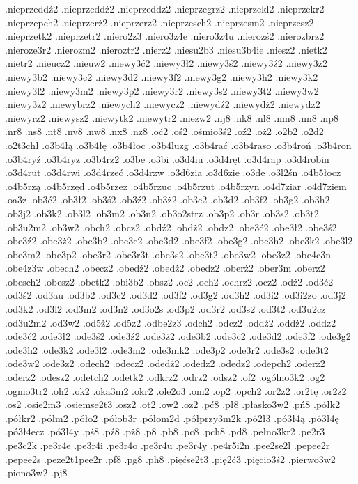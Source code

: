 {.nieprzeddź2
.nieprzeddż2
.nieprzeddz2
.nieprzegrz2
.nieprzekl2
.nieprzekr2
.nieprzepch2
.nieprzerż2
.nieprzerz2
.nieprzesch2
.nieprzesm2
.nieprzesz2
.nieprzetk2
.nieprzetr2
.niero2z3
.niero3z4e
.niero3z4u
.nierozś2
.nierozbrz2
.nieroze3r2
.nierozm2
.nieroztr2
.nierz2
.niesu2b3
.niesu3b4ie
.niesz2
.nietk2
.nietr2
.nieucz2
.nieuw2
.niewy3ć2
.niewy3ł2
.niewy3ś2
.niewy3ź2
.niewy3ż2
.niewy3b2
.niewy3c2
.niewy3d2
.niewy3f2
.niewy3g2
.niewy3h2
.niewy3k2
.niewy3l2
.niewy3m2
.niewy3p2
.niewy3r2
.niewy3s2
.niewy3t2
.niewy3w2
.niewy3z2
.niewybrz2
.niewych2
.niewycz2
.niewydź2
.niewydż2
.niewydz2
.niewyrz2
.niewysz2
.niewytk2
.niewytr2
.niezw2
.nj8
.nk8
.nl8
.nm8
.nn8
.np8
.nr8
.ns8
.nt8
.nv8
.nw8
.nx8
.nz8
.oć2
.oś2
.ośmio3ś2
.oź2
.oż2
.o2b2
.o2d2
.o2t3chł
.o3b4łą
.o3b4łę
.o3b4łoc
.o3b4luzg
.o3b4rać
.o3b4raso
.o3b4roń
.o3b4ron
.o3b4ryź
.o3b4ryz
.o3b4rz2
.o3be
.o3bi
.o3d4iu
.o3d4ręt
.o3d4rap
.o3d4robin
.o3d4rut
.o3d4rwi
.o3d4rzeć
.o3d4rzw
.o3d6zia
.o3d6zie
.o3de
.o3l2śn
.o4b5łocz
.o4b5rzą
.o4b5rzęd
.o4b5rzez
.o4b5rzuc
.o4b5rzut
.o4b5rzyn
.o4d7ziar
.o4d7ziem
.oa3z
.ob3ć2
.ob3ł2
.ob3ś2
.ob3ź2
.ob3ż2
.ob3c2
.ob3d2
.ob3f2
.ob3g2
.ob3h2
.ob3j2
.ob3k2
.ob3l2
.ob3m2
.ob3n2
.ob3o2strz
.ob3p2
.ob3r
.ob3s2
.ob3t2
.ob3u2m2
.ob3w2
.obch2
.obcz2
.obdź2
.obdż2
.obdz2
.obe3ć2
.obe3ł2
.obe3ś2
.obe3ź2
.obe3ż2
.obe3b2
.obe3c2
.obe3d2
.obe3f2
.obe3g2
.obe3h2
.obe3k2
.obe3l2
.obe3m2
.obe3p2
.obe3r2
.obe3r3t
.obe3s2
.obe3t2
.obe3w2
.obe3z2
.obe4c3n
.obe4z3w
.obech2
.obecz2
.obedź2
.obedż2
.obedz2
.oberż2
.ober3m
.oberz2
.obesch2
.obesz2
.obetk2
.obi3b2
.obsz2
.oc2
.och2
.ochrz2
.ocz2
.odź2
.od3ć2
.od3ś2
.od3au
.od3b2
.od3c2
.od3d2
.od3f2
.od3g2
.od3h2
.od3i2
.od3i2zo
.od3j2
.od3k2
.od3l2
.od3m2
.od3n2
.od3o2s
.od3p2
.od3r2
.od3s2
.od3t2
.od3u2cz
.od3u2m2
.od3w2
.od5ż2
.od5z2
.odbe2z3
.odch2
.odcz2
.oddź2
.oddż2
.oddz2
.ode3ć2
.ode3ł2
.ode3ś2
.ode3ź2
.ode3ż2
.ode3b2
.ode3c2
.ode3d2
.ode3f2
.ode3g2
.ode3h2
.ode3k2
.ode3l2
.ode3m2
.ode3mk2
.ode3p2
.ode3r2
.ode3s2
.ode3t2
.ode3w2
.ode3z2
.odech2
.odecz2
.odedź2
.odedż2
.odedz2
.odepch2
.oderż2
.oderz2
.odesz2
.odetch2
.odetk2
.odkrz2
.odrz2
.odsz2
.of2
.ogólno3k2
.og2
.ognio3tr2
.oh2
.ok2
.oka3m2
.okr2
.ole2o3
.om2
.op2
.opch2
.or2ż2
.or2tę
.or2z2
.os2
.osie2m3
.osiemse2t3
.osz2
.ot2
.ow2
.oz2
.pć8
.pł8
.płasko3w2
.pń8
.półk2
.półkr2
.półm2
.póło2
.półob3r
.półom2d
.półprzy3m2k
.pó2ł3
.pó3ł4ą
.pó3ł4ę
.pó3ł4ecz
.pó3ł4y
.pś8
.pź8
.pż8
.p8
.pb8
.pc8
.pch8
.pd8
.pełno3kr2
.pe2r3
.pe3c2k
.pe3r4e
.pe3r4i
.pe3r4o
.pe3r4u
.pe3r4y
.pe4r5i2n
.pee2se2l
.pepee2r
.pepee2s
.peze2t1pee2r
.pf8
.pg8
.ph8
.pięćse2t3
.pię2ć3
.pięcio3ś2
.pierwo3w2
.piono3w2
.pj8
}
